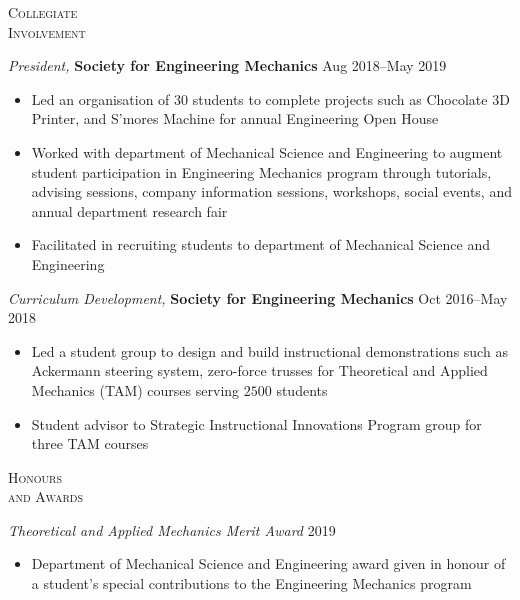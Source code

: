 \documentclass[10pt]{article}
\begin{document}
\begin{multicols}{2}
\textsc{\small Collegiate \\ Involvement}
\columnbreak

{\sl President,} \textbf{Society for Engineering Mechanics} \hfill Aug 2018--May 2019

\vspace{-2.0em}
\begin{itemize}[label=-]
    \setlength\itemsep{-0.5em}
    \item Led an organisation of $30$ students to complete projects such as Chocolate 3D Printer, and S'mores Machine for annual Engineering Open House
    \item Worked with department of Mechanical Science and Engineering to augment student participation in Engineering Mechanics program through tutorials, advising sessions, company information sessions, workshops, social events, and annual department research fair
    \item Facilitated in recruiting students to department of Mechanical Science and Engineering
\end{itemize}
\vspace{-2.0em}
%
\vspace{0.5em}
%
{\sl Curriculum Development,} \textbf{Society for Engineering Mechanics} \hfill Oct 2016--May 2018

\vspace{-2.0em}
\begin{itemize}[label=-]
    \setlength\itemsep{-0.5em}
    \item Led a student group to design and build instructional demonstrations such as  Ackermann steering system, zero-force trusses for Theoretical and Applied Mechanics (TAM) courses serving $2500$ students
    \item Student advisor to Strategic Instructional Innovations Program group for three TAM courses
\end{itemize}
\vspace{-2.0em}

\end{multicols}
\vspace{-1.5em} 
\begin{multicols}{2}
\textsc{\small Honours \\ and Awards}
\columnbreak

{\sl Theoretical and Applied Mechanics Merit Award} \hfill 2019

\vspace{-2.0em}
\begin{itemize}[label= ]
    \setlength\itemsep{-0.5em}
    \item  Department of Mechanical Science and Engineering award given in honour of a student's special contributions to the Engineering Mechanics program
\end{itemize}
\vspace{-2.0em}


\end{multicols}
\end{document}

